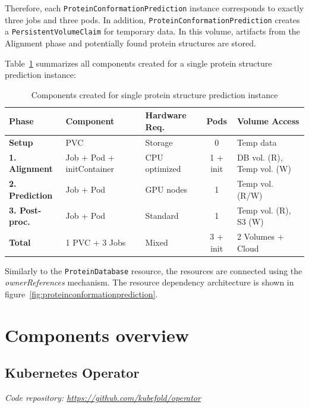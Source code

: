 Therefore, each \texttt{ProteinConformationPrediction} instance corresponds to exactly three jobs and three pods.
In addition, \texttt{ProteinConformationPrediction} creates a \texttt{PersistentVolumeClaim} for temporary data.
In this volume, artifacts from the Alignment phase and potentially found protein structures are stored.

Table~\ref{tab:protein_prediction_components} summarizes all components created for a single protein structure prediction instance:

\begin{table}[htbp]
\centering
\caption{Components created for single protein structure prediction instance}
\label{tab:protein_prediction_components}
\small
\begin{tabular}{|l|l|p{2.2cm}|c|p{2.8cm}|}
\hline
\textbf{Phase} & \textbf{Component} & \textbf{Hardware Req.} & \textbf{Pods} & \textbf{Volume Access} \\
\hline
\textbf{Setup} & 
PVC & 
Storage & 
0 & 
Temp data \\
\hline
\textbf{1. Alignment} & 
Job + Pod + initContainer & 
CPU optimized & 
1 + init & 
DB vol. (R), Temp vol. (W) \\
\hline
\textbf{2. Prediction} & 
Job + Pod & 
GPU nodes & 
1 & 
Temp vol. (R/W) \\
\hline
\textbf{3. Post-proc.} & 
Job + Pod & 
Standard & 
1 & 
Temp vol. (R), S3 (W) \\
\hline
\textbf{Total} & 
1 PVC + 3 Jobs & 
Mixed & 
3 + init & 
2 Volumes + Cloud \\
\hline
\end{tabular}
\end{table}

Similarly to the \texttt{ProteinDatabase} resource, the resources are connected using the \textit{ownerReferences} mechanism.
The resource dependency architecture is shown in figure~\ref{fig:proteinconformationprediction}.


\section{Components overview}

\subsection{Kubernetes Operator}\label{subsec:component-operator}
\textit{Code repository: \url{https://github.com/kubefold/operator}}

